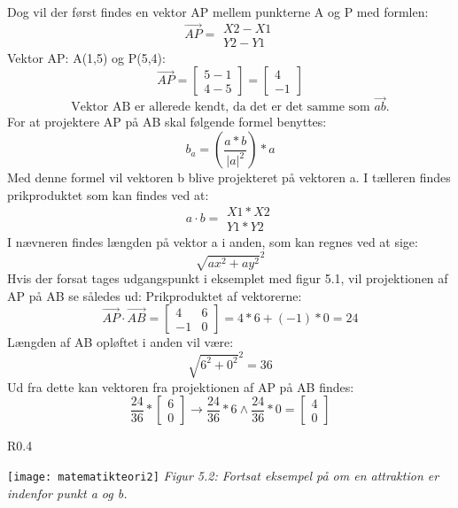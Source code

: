 Dog vil der først findes en vektor AP mellem punkterne A og P med formlen: \[ \overrightarrow{AP} = \begin{matrix}X2-X1 \\ Y2-Y1\end{matrix} \]
Vektor AP: A(1,5) og P(5,4): \[ \overrightarrow{AP} = \begin{bmatrix}5-1 \\ 4-5\end{bmatrix} = \begin{bmatrix} 4 \\ -1 \end{bmatrix} \]
\[ \text{Vektor AB er allerede kendt, da det er det samme som } \overrightarrow{ab} \text{.} \]
For at projektere AP på AB skal følgende formel benyttes: \citep{ProjektionAfVektor} \[ b_{a} = (\frac{a*b}{|a|^2}) * a \]
Med denne formel vil vektoren b blive projekteret på vektoren a. I tælleren findes prikproduktet som kan findes ved at: \[ a \cdot b = \begin{matrix}X1 * X2 \\ Y1 * Y2\end{matrix}  \]
I nævneren findes længden på vektor a i anden, som kan regnes ved at sige: \[ \sqrt{ax^2+ay^2}^2 \]
Hvis der forsat tages udgangspunkt i eksemplet med figur 5.1, vil projektionen af AP på AB se således ud:
Prikproduktet af vektorerne: \[ \overrightarrow{AP} \cdot \overrightarrow{AB} = \begin{bmatrix} 4 & 6 \\ -1 & 0 \end{bmatrix} = 4*6+(-1)*0 = 24 \]
Længden af AB opløftet i anden vil være: \[ \sqrt{6^2+0^2}^2 = 36 \]
Ud fra dette kan vektoren fra projektionen af AP på AB findes: 
\[ \frac{24}{36} * \begin{bmatrix} 6 \\ 0 \end{bmatrix} \rightarrow \frac{24}{36} * 6 \wedge \frac{24}{36} * 0 = \begin{bmatrix} 4 \\ 0 \end{bmatrix} \]

\begin{wrapfigure}{R}{0.4\textwidth}
  \vspace{-50pt}
  \begin{center}
    \texttt{[image: matematikteori2]} \newline
    \textit{Figur 5.2: Fortsat eksempel på om en attraktion er indenfor punkt a og b.}\newline
  \end{center}
  \vspace{-20pt}
  \vspace{0pt}
\end{wrapfigure}


